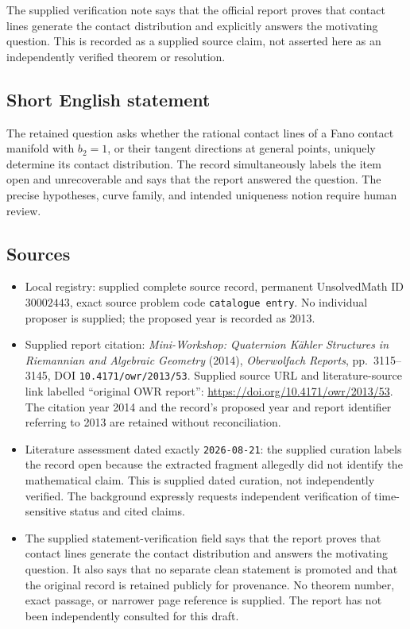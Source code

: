\documentclass[11pt]{article}
\begin{document}
The supplied verification note says that the official report proves that contact lines generate the contact distribution and explicitly answers the motivating question. This is recorded as a supplied source claim, not asserted here as an independently verified theorem or resolution.
\subsection{Short English statement}
The retained question asks whether the rational contact lines of a Fano contact manifold with \(b_2=1\), or their tangent directions at general points, uniquely determine its contact distribution. The record simultaneously labels the item open and unrecoverable and says that the report answered the question. The precise hypotheses, curve family, and intended uniqueness notion require human review.
\subsection{Sources}
\begin{itemize}
\item Local registry: supplied complete source record, permanent UnsolvedMath ID \(30002443\), exact source problem code \texttt{catalogue entry}. No individual proposer is supplied; the proposed year is recorded as 2013.
\item Supplied report citation: \emph{Mini-Workshop: Quaternion Kähler Structures in Riemannian and Algebraic Geometry} (2014), \emph{Oberwolfach Reports}, pp.\ 3115--3145, DOI \texttt{10.4171/owr/2013/53}. Supplied source URL and literature-source link labelled ``original OWR report'': \url{https://doi.org/10.4171/owr/2013/53}. The citation year 2014 and the record's proposed year and report identifier referring to 2013 are retained without reconciliation.
\item Literature assessment dated exactly \texttt{2026-08-21}: the supplied curation labels the record open because the extracted fragment allegedly did not identify the mathematical claim. This is supplied dated curation, not independently verified. The background expressly requests independent verification of time-sensitive status and cited claims.
\item The supplied statement-verification field says that the report proves that contact lines generate the contact distribution and answers the motivating question. It also says that no separate clean statement is promoted and that the original record is retained publicly for provenance. No theorem number, exact passage, or narrower page reference is supplied. The report has not been independently consulted for this draft.
\end{itemize}
\end{document}
